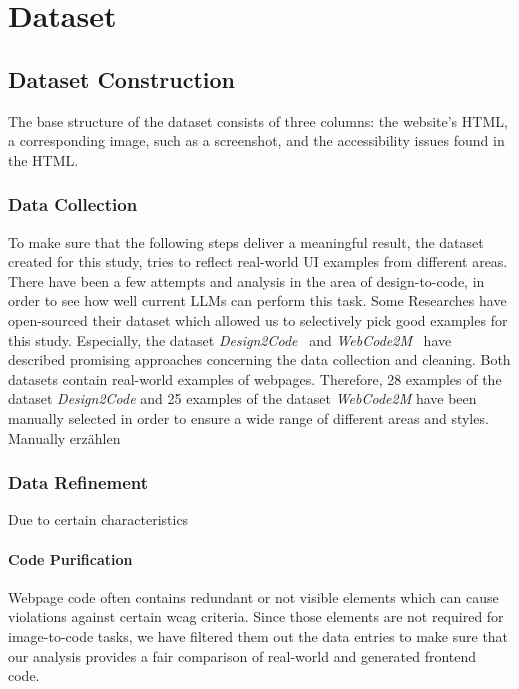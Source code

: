 \chapter{Dataset}\label{chapter:Dataset}

\section{Dataset Construction}
The base structure of the dataset consists of three columns: the website's HTML, 
a corresponding image, such as a screenshot, and the accessibility issues found 
in the HTML. \newline

\subsection{Data Collection}
To make sure that the following steps deliver a meaningful result, the 
dataset created for this study, tries to reflect real-world UI examples
from different areas. \newline
There have been a few attempts and analysis in the area of design-to-code, in 
order to see how well current LLMs can perform this task. Some Researches  
have open-sourced their dataset which allowed us to selectively pick good 
examples for this study. Especially, the dataset \textit{Design2Code}~\parencite{si2024design2code} 
and \textit{WebCode2M}~\parencite{gui2024webcode2m} have described promising 
approaches concerning the data collection and cleaning. Both datasets contain
real-world examples of webpages. \newline
Therefore, 28 examples of the dataset \textit{Design2Code} and 25 examples of 
the dataset \textit{WebCode2M} have been manually selected in order to ensure 
a wide range of different areas and styles. \newline
Manually erzählen

\subsection{Data Refinement}
Due to certain characteristics

\subsubsection{Code Purification}
Webpage code often contains redundant or not visible elements which can 
cause violations against certain wcag criteria. Since those elements are not 
required for image-to-code tasks, we have filtered them out the data entries
to make sure that our analysis provides a fair comparison of real-world and 
generated frontend code.

